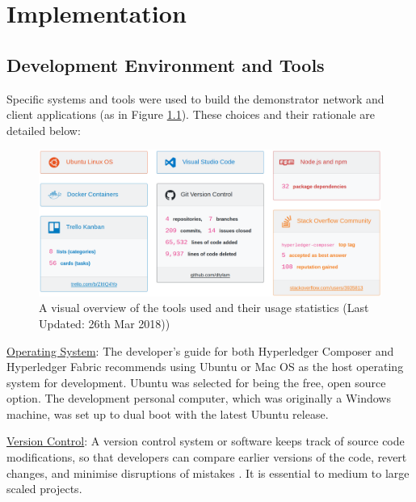 \chapter{Implementation}

\graphicspath{{Chapter6/Figs/Raster/}{Chapter6/Figs/}}

\section{Development Environment and Tools}

Specific systems and tools were used to build the demonstrator network and client applications (as in Figure \ref{fig:platform_stats}).
These choices and their rationale are detailed below:

\begin{figure}[!ht]
	\centering
	\includegraphics[width=1.05\textwidth]{platform_stats}
	\caption[Development Tools and Usage Statistics]
	{A visual overview of the tools used and their usage statistics (Last Updated: 26th Mar 2018))}
	\label{fig:platform_stats}
\end{figure}

\underline{Operating System}: The developer's guide for both Hyperledger Composer and Hyperledger Fabric
recommends using Ubuntu or Mac OS as the host operating system for development.
Ubuntu was selected for being the free, open source option. The development personal computer, which was originally
a Windows machine, was set up to dual boot with the latest Ubuntu release.

\underline{Version Control}: A version control system or software keeps track of source code modifications,
so that developers can compare earlier versions of the code, revert changes, and
minimise disruptions of mistakes \citep{atlassian2018vcs}. It is essential to medium to large scaled projects.

